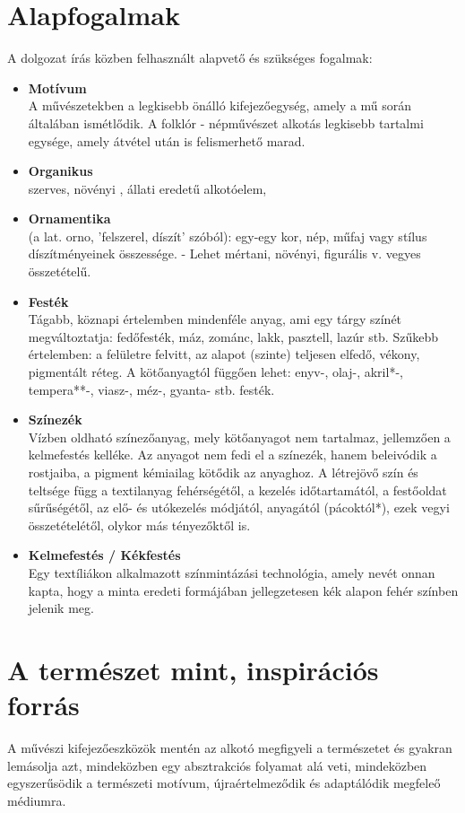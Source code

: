 \section{Alapfogalmak}
A dolgozat írás közben felhasznált alapvető és szükséges fogalmak:
\begin{itemize}
	\item \textbf{Motívum} \\  A művészetekben a legkisebb önálló kifejezőegység, amely a mű során általában ismétlődik. A folklór - népművészet alkotás legkisebb tartalmi egysége, amely átvétel után is felismerhető marad.
	\item \textbf{Organikus} \\ szerves, növényi , állati eredetű alkotóelem, 
	\item \textbf{Ornamentika} \\ (a lat. orno, 'felszerel, díszít' szóból): egy-egy kor, nép, műfaj vagy stílus díszítményeinek összessége. - Lehet mértani, növényi, figurális v. vegyes összetételű.
	\item \textbf{Festék} \\ Tágabb, köznapi értelemben mindenféle anyag, ami egy tárgy színét megváltoztatja: fedőfesték, máz, zománc, lakk, pasztell, lazúr stb. Szűkebb értelemben: a felületre felvitt, az alapot (szinte) teljesen elfedő, vékony, pigmentált réteg. A kötőanyagtól függően lehet: enyv-, olaj-, akril*-, tempera**-, viasz-, méz-, gyanta- stb. festék.
	\item \textbf{Színezék} \\
	Vízben oldható színezőanyag, mely kötőanyagot nem tartalmaz, jellemzően a kelmefestés kelléke. Az anyagot nem fedi el a színezék, hanem beleivódik a rostjaiba, a pigment kémiailag kötődik az anyaghoz. A létrejövő szín és teltsége függ a textilanyag fehérségétől, a kezelés időtartamától, a festőoldat sűrűségétől, az elő- és utókezelés módjától, anyagától (pácoktól*), ezek vegyi összetételétől, olykor más tényezőktől is.
	\item \textbf{Kelmefestés / Kékfestés} \\ 
	Egy textíliákon alkalmazott színmintázási technológia, amely nevét onnan kapta, hogy a minta eredeti formájában jellegzetesen kék alapon fehér színben jelenik meg.
	\end{itemize}

\section{A természet mint, inspirációs forrás}
A művészi kifejezőeszközök mentén az alkotó megfigyeli a természetet és gyakran lemásolja azt, mindeközben egy absztrakciós folyamat alá veti, mindeközben egyszerűsödik a természeti motívum, újraértelmeződik és adaptálódik megfeleő médiumra.

